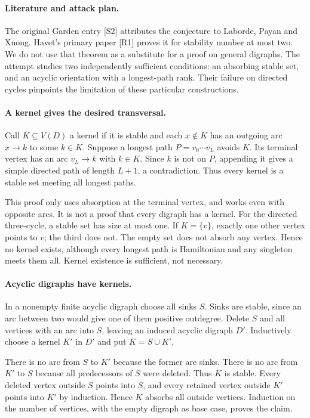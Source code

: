 \documentclass[11pt,a4paper]{article}
\begin{document}
\paragraph{Literature and attack plan.}
The original Garden entry [S2] attributes the conjecture to Laborde, Payan and Xuong. Havet's primary paper [R1] proves it for stability number at most two. We do not use that theorem as a substitute for a proof on general digraphs. The attempt studies two independently sufficient conditions: an absorbing stable set, and an acyclic orientation with a longest-path rank. Their failure on directed cycles pinpoints the limitation of these particular constructions.

\paragraph{A kernel gives the desired transversal.}
Call $K\subseteq V(D)$ a kernel if it is stable and each $x\notin K$ has an outgoing arc $x\to k$ to some $k\in K$. Suppose a longest path $P=v_0\cdots v_L$ avoids $K$. Its terminal vertex has an arc $v_L\to k$ with $k\in K$. Since $k$ is not on $P$, appending it gives a simple directed path of length $L+1$, a contradiction. Thus every kernel is a stable set meeting all longest paths.

This proof only uses absorption at the terminal vertex, and works even with opposite arcs. It is not a proof that every digraph has a kernel. For the directed three-cycle, a stable set has size at most one. If $K=\{v\}$, exactly one other vertex points to $v$; the third does not. The empty set does not absorb any vertex. Hence no kernel exists, although every longest path is Hamiltonian and any singleton meets them all. Kernel existence is sufficient, not necessary.

\paragraph{Acyclic digraphs have kernels.}
In a nonempty finite acyclic digraph choose all sinks $S$. Sinks are stable, since an arc between two would give one of them positive outdegree. Delete $S$ and all vertices with an arc into $S$, leaving an induced acyclic digraph $D'$. Inductively choose a kernel $K'$ in $D'$ and put $K=S\cup K'$.

There is no arc from $S$ to $K'$ because the former are sinks. There is no arc from $K'$ to $S$ because all predecessors of $S$ were deleted. Thus $K$ is stable. Every deleted vertex outside $S$ points into $S$, and every retained vertex outside $K'$ points into $K'$ by induction. Hence $K$ absorbs all outside vertices. Induction on the number of vertices, with the empty digraph as base case, proves the claim.
\end{document}
